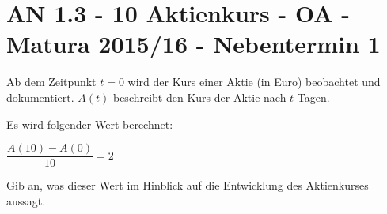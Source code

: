 \section{AN 1.3 - 10 Aktienkurs - OA - Matura 2015/16 - Nebentermin 1}

\begin{beispiel}[AN 1.3]{1} %
Ab dem Zeitpunkt $t=0$ wird der Kurs einer Aktie (in Euro) beobachtet und dokumentiert. $A(t)$ beschreibt den Kurs der Aktie nach $t$ Tagen. \leer

Es wird folgender Wert berechnet:

$\dfrac{A(10)-A(0)}{10}=2$ \leer

Gib an, was dieser Wert im Hinblick auf die Entwicklung des Aktienkurses aussagt. 

\end{beispiel}